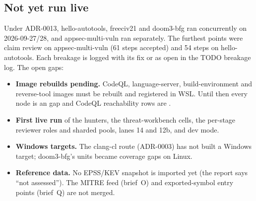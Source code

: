 \documentclass[10pt,a4paper]{article}
\begin{document}
\subsection*{Not yet run live}
Under ADR-0013, hello-autotools, freeciv21 and doom3-bfg ran  concurrently on
2026-09-27/28, and appsec-multi-vuln ran separately. The furthest points were claim review on
appsec-multi-vuln (61 steps accepted) and 54 steps on hello-autotools. Each breakage is logged
with its fix or as open in the TODO breakage log. The open gaps:
\begin{itemize}
\item \textbf{Image rebuilds pending.} CodeQL, language-server, build-environment and reverse-tool
images must be rebuilt and registered in WSL. Until then every  node is an
 gap and CodeQL reachability rows are .
\item \textbf{First live run} of the hunters, the threat-workbench cells, the per-stage reviewer
roles and sharded pools, lanes 14 and 12b, and dev mode.
\item \textbf{Windows targets.} The clang-cl route (ADR-0003) has not built a Windows target; doom3-bfg's
units became coverage gaps on Linux.
\item \textbf{Reference data.} No EPSS/KEV snapshot is imported yet (the report says ``not
assessed''). The MITRE feed (brief~O) and exported-symbol entry points (brief~Q) are not merged.
\end{itemize}
\end{document}
